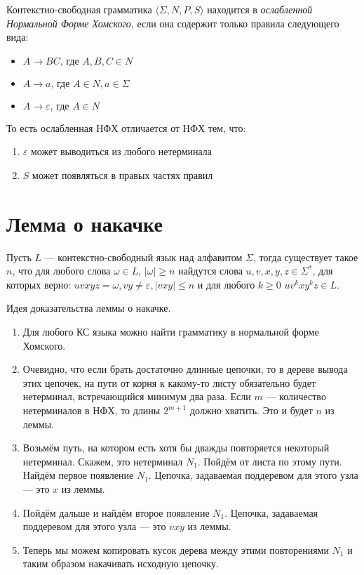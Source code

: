 \begin{definition}\label{defn:wCNF}
Контекстно-свободная грамматика $\langle \Sigma, N, P, S\rangle$ находится в \textit{ослабленной Нормальной Форме Хомского}, если она содержит только правила следующего вида:

\begin{itemize}
  \item $A \to B C \text{, где } A, B, C \in N$
  \item $A \to a \text{, где } A \in N, a \in \Sigma$
  \item $A \to \varepsilon \text{, где } A \in N$
\end{itemize}

То есть ослабленная НФХ отличается от НФХ тем, что:
\begin{enumerate}
  \item $\varepsilon$ может выводиться из любого нетерминала
  \item $S$ может появляться в правых частях правил
\end{enumerate}
\end{definition}

\section{Лемма о накачке}

\begin{lemma}
Пусть $L$ --- контекстно-свободный язык над алфавитом $\Sigma$, тогда существует такое $n$, что для любого слова $\omega \in L$, $|\omega| \geq n$ найдутся слова $u,v,x,y,z\in \Sigma^*$, для которых верно: $uvxyz = \omega, vy\neq \varepsilon,|vxy|\leq n$ и для любого $k \geq 0$  $uv^kxy^kz \in L$.
\end{lemma}

Идея доказательства леммы о накачке.

\begin{enumerate}
    \item Для любого КС языка можно найти грамматику в нормальной форме Хомского.
    \item Очевидно, что если брать достаточно длинные цепочки, то в дереве вывода этих цепочек, на пути от корня к какому-то листу обязательно будет нетерминал, встречающийся минимум два раза. Если $m$ --- количество нетерминалов в НФХ, то длины $2^{m+1}$ должно хватить. Это и будет $n$ из леммы.
    \item Возьмём путь, на котором есть хотя бы дважды повторяется некоторый нетерминал. Скажем, это нетерминал  $N_1$. Пойдём от листа по этому пути. Найдём первое появление $N_1$. Цепочка, задаваемая поддеревом для этого узла --- это $x$ из леммы.
    \item Пойдём дальше и найдём второе появление $N_1$. Цепочка, задаваемая поддеревом для этого узла --- это $vxy$ из леммы.
    \item Теперь мы можем копировать кусок дерева между этими повторениями $N_1$ и таким образом накачивать исходную цепочку.
\end{enumerate}

